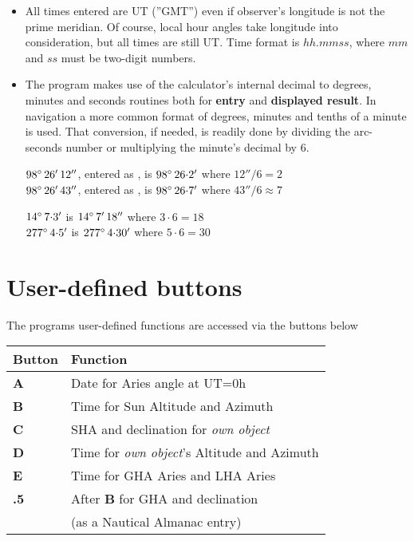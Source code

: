\documentclass[swedish,a4paper,onepage, 11pt]{scrbook}
\begin{document}
\begin{itemize}
\item All times entered are UT (''GMT'') even if observer's longitude is not the prime meridian. Of course, local hour angles take longitude into consideration, but all times are still UT. Time format is $hh.mmss$, where $mm$ and $ss$ must be two-digit numbers.


\item The program makes use of the calculator's internal decimal to degrees, minutes and seconds routines both for \textbf{entry} and \textbf{displayed result}. In navigation a more common format of degrees, minutes and tenths of a minute is used. That conversion, if needed, is readily done by dividing the arc-seconds number or multiplying the minute's decimal by 6.


 $98\degree\, 26'\, 12''$, entered as ,  is $98\degree\, 26{\cdot}2'$ where $12''/6=2$\\
 $98\degree\, 26'\, 43''$, entered as , is $98\degree\, 26{\cdot}7'$ where $43''/6\approx7$
 \slutex
 

 $14\degree\, 7{\cdot}3'$  is $14\degree\, 7'\, 18''$ where $3 \cdot 6=18$\\
 $277\degree\, 4{\cdot}5'$  is $277\degree\, 4{\cdot}30'$ where $5 \cdot 6=30$
 \slutex
 
\end{itemize}
 
\section{User-defined  buttons} 

The programs user-defined functions are accessed via the buttons below

\begin{center}
\begin{tabular}{ll}
Button & Function \\
\hline
\textbf{\textsf{A}} & Date for Aries angle at UT=0h\\
\textbf{\textsf{B}} & Time for Sun Altitude and Azimuth \\
\textbf{\textsf{C}} & SHA and declination for \emph{own object} \\
\textbf{\textsf{D}} & Time for \emph{own object}'s Altitude and Azimuth \\
\textbf{\textsf{E}} & Time for GHA Aries and LHA Aries\\
\textbf{\textsf{.5}} & After \textbf{\textsf{B}} for GHA and declination\\
& (as a Nautical Almanac entry)\\
\end{tabular}
\end{center}
\end{document}
